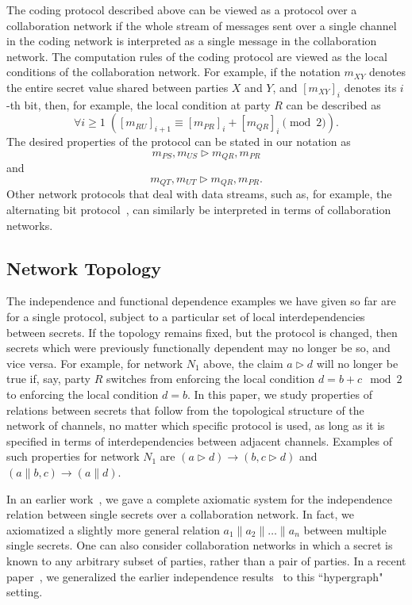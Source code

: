 \documentclass{llncs}
\begin{document}
The coding protocol described above can be viewed as a protocol over a collaboration network if the whole stream of messages sent over a single channel in the coding network is interpreted as a single message in the collaboration network.  The computation rules
of the coding protocol are viewed as the local conditions of the collaboration network. For example, if the notation $m_{XY}$ denotes the entire secret value shared between parties $X$ and $Y$, and $[m_{XY}]_i$ denotes its $i$-th bit, then, for example, the local condition at party $R$ can be described as 
$$ \forall i\ge 1\; \left([m_{RU}]_{i+1}\equiv [m_{PR}]_i + [m_{QR}]_i \pmod 2\right).$$ 
The desired properties of the protocol can be stated in our notation as 
$$m_{PS},m_{US}\rhd m_{QR},m_{PR}$$ and
$$m_{QT},m_{UT}\rhd m_{QR},m_{PR}.$$ Other network protocols that deal with data streams, such as, for example, the alternating bit protocol~\cite{bsw69}, can similarly be interpreted in terms of collaboration networks.



\subsection{Network Topology}

The independence and functional dependence examples we have given so far are for a single protocol, subject to a particular set of local interdependencies between secrets. If the topology remains fixed, but the protocol is changed, then secrets which were previously functionally dependent may no longer be so, and vice versa. For example, for network $N_1$ above, the claim $a\rhd d$ will no longer be true if, say, party $R$ switches from enforcing the local condition $d=b+c \mod 2$ to enforcing the local condition $d=b$. In this paper, we study properties of relations between secrets that follow from the topological structure of the network of channels, no matter which specific protocol is used, as long as it is specified in terms of interdependencies between adjacent channels. Examples of such properties for network $N_1$ are $(a\rhd d) \rightarrow (b,c\rhd d)$ and $(a\parallel b,c) \rightarrow (a\parallel d)$. 

In an earlier work~\cite{mn09a}, we gave a complete axiomatic system for the independence relation between single secrets over a collaboration network. In fact, we axiomatized a slightly more general relation $a_1\parallel a_2\parallel \dots \parallel a_n$ between multiple single secrets.  One can also consider collaboration networks in which a secret is known to any arbitrary subset of parties, rather than a pair of parties.  In a recent paper~\cite{mn10clima}, we generalized the earlier independence results~\cite{mn09a} to this ``hypergraph" setting.
 
\end{document}
